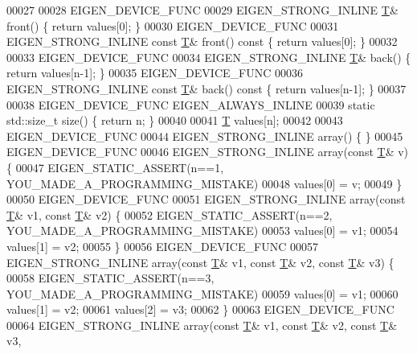 \begin{DoxyCode}
00027 
00028   EIGEN\_DEVICE\_FUNC
00029   EIGEN\_STRONG\_INLINE \hyperlink{group___sparse_core___module_class_eigen_1_1_triplet}{T}& front() \{ \textcolor{keywordflow}{return} values[0]; \}
00030   EIGEN\_DEVICE\_FUNC
00031   EIGEN\_STRONG\_INLINE \textcolor{keyword}{const} \hyperlink{group___sparse_core___module_class_eigen_1_1_triplet}{T}& front()\textcolor{keyword}{ const }\{ \textcolor{keywordflow}{return} values[0]; \}
00032 
00033   EIGEN\_DEVICE\_FUNC
00034   EIGEN\_STRONG\_INLINE \hyperlink{group___sparse_core___module_class_eigen_1_1_triplet}{T}& back() \{ \textcolor{keywordflow}{return} values[n-1]; \}
00035   EIGEN\_DEVICE\_FUNC
00036   EIGEN\_STRONG\_INLINE \textcolor{keyword}{const} \hyperlink{group___sparse_core___module_class_eigen_1_1_triplet}{T}& back()\textcolor{keyword}{ const }\{ \textcolor{keywordflow}{return} values[n-1]; \}
00037 
00038   EIGEN\_DEVICE\_FUNC EIGEN\_ALWAYS\_INLINE
00039   \textcolor{keyword}{static} std::size\_t size() \{ \textcolor{keywordflow}{return} n; \}
00040 
00041   \hyperlink{group___sparse_core___module_class_eigen_1_1_triplet}{T} values[n];
00042 
00043   EIGEN\_DEVICE\_FUNC
00044   EIGEN\_STRONG\_INLINE array() \{ \}
00045   EIGEN\_DEVICE\_FUNC
00046   EIGEN\_STRONG\_INLINE array(\textcolor{keyword}{const} \hyperlink{group___sparse_core___module_class_eigen_1_1_triplet}{T}& v) \{
00047     EIGEN\_STATIC\_ASSERT(n==1, YOU\_MADE\_A\_PROGRAMMING\_MISTAKE)
00048     values[0] = v;
00049   \}
00050   EIGEN\_DEVICE\_FUNC
00051   EIGEN\_STRONG\_INLINE array(\textcolor{keyword}{const} \hyperlink{group___sparse_core___module_class_eigen_1_1_triplet}{T}& v1, \textcolor{keyword}{const} \hyperlink{group___sparse_core___module_class_eigen_1_1_triplet}{T}& v2) \{
00052     EIGEN\_STATIC\_ASSERT(n==2, YOU\_MADE\_A\_PROGRAMMING\_MISTAKE)
00053     values[0] = v1;
00054     values[1] = v2;
00055   \}
00056   EIGEN\_DEVICE\_FUNC
00057   EIGEN\_STRONG\_INLINE array(\textcolor{keyword}{const} \hyperlink{group___sparse_core___module_class_eigen_1_1_triplet}{T}& v1, \textcolor{keyword}{const} \hyperlink{group___sparse_core___module_class_eigen_1_1_triplet}{T}& v2, \textcolor{keyword}{const} \hyperlink{group___sparse_core___module_class_eigen_1_1_triplet}{T}& v3) \{
00058     EIGEN\_STATIC\_ASSERT(n==3, YOU\_MADE\_A\_PROGRAMMING\_MISTAKE)
00059     values[0] = v1;
00060     values[1] = v2;
00061     values[2] = v3;
00062   \}
00063   EIGEN\_DEVICE\_FUNC
00064   EIGEN\_STRONG\_INLINE array(\textcolor{keyword}{const} \hyperlink{group___sparse_core___module_class_eigen_1_1_triplet}{T}& v1, \textcolor{keyword}{const} \hyperlink{group___sparse_core___module_class_eigen_1_1_triplet}{T}& v2, \textcolor{keyword}{const} \hyperlink{group___sparse_core___module_class_eigen_1_1_triplet}{T}& v3,

\end{DoxyCode}
